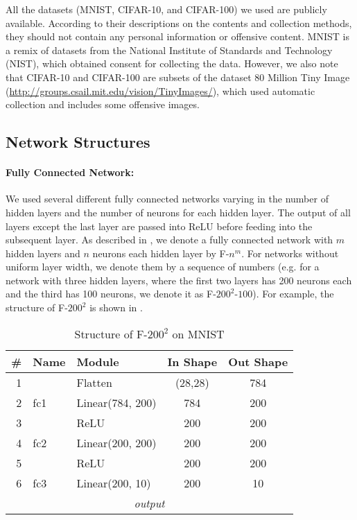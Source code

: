 All the datasets (MNIST, CIFAR-10, and CIFAR-100) we used are publicly available. According to their descriptions on the contents and collection methods, they should not contain any personal information or offensive content. MNIST is a remix of datasets from the National Institute of Standards and Technology (NIST), which obtained consent for collecting the data. However, we also note that CIFAR-10 and CIFAR-100 are subsets of the dataset 80 Million Tiny Image \citep{torralba2007tiny} (\url{http://groups.csail.mit.edu/vision/TinyImages/}), which used automatic collection and includes some offensive images.

\subsection{Network Structures}
\label{appendix_exp_nn}
\paragraph{Fully Connected Network:}
We used several different fully connected networks varying in the number of hidden layers and the number of neurons for each hidden layer. The output of all layers except the last layer are passed into ReLU before feeding into the subsequent layer.  As described in , we denote a fully connected network with $m$ hidden layers and $n$ neurons each hidden layer by F-$n^m$. For networks without uniform layer width, we denote them by a sequence of numbers (e.g. for a network with three hidden layers, where the first two layers has 200 neurons each and the third has 100 neurons, we denote it as F-$200^2$-$100$). For example, the structure of F-$200^2$ is shown in .

\begin{table}[h]
\small
  \centering
  \caption{Structure of F-$200^2$ on MNIST}
  \vskip 0.1in
    \begin{center}
    \begin{tabular}{rllcc}
    \toprule
    \# & Name & Module & In Shape & Out Shape\\
    \midrule
    1 & & Flatten & (28,28) & 784\\
    2 & fc1 & Linear(784, 200) & 784 & 200\\
    3 & & ReLU & 200 & 200\\
    4 & fc2 & Linear(200, 200) & 200 & 200\\
    5 & & ReLU & 200 & 200\\
    6 & fc3 & Linear(200, 10) & 200 & 10\\
    \multicolumn{5}{c}{\emph{output}}\\\bottomrule
    \end{tabular}%
\end{center}

  \label{tab:appendix_fc_struct}%
\end{table}%

